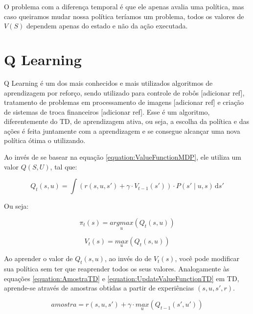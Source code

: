 O problema com a diferença temporal é que ele apenas avalia uma política, mas caso queiramos mudar nossa política teríamos um problema, todos os valores de $ V \left( S \right) $ dependem apenas do estado e não da ação executada.

\section{Q Learning}

Q Learning é um dos mais conhecidos e mais utilizados algoritmos de aprendizagem por reforço, sendo utilizado para controle de robôs [adicionar ref], tratamento de problemas em processamento de imagens [adicionar ref] e criação de sistemas de troca financeiros [adicionar ref]. Esse é um algoritmo, diferentemente do TD, de aprendizagem ativa, ou seja, a escolha da política e das ações é feita juntamente com a aprendizagem e se consegue alcançar uma nova política ótima o utilizando.

Ao invés de se basear na equação \ref{equation:ValueFunctionMDP}, ele utiliza um valor $ Q \left( S, U \right) $, tal que:

\begin{equation} \label{equation:QValueFunctionQLearning}
    Q_t \left( s, u \right) = \int \! \left( r \left( s, u, s' \right) + \gamma \cdot V_{t-1} \left( s' \right) \right) \cdot P \left( s' \mid u, s \right) \, \mathrm{d}s'
\end{equation}

Ou seja:

\begin{equation} \label{equation:PolicySelectionQLearning}
    \pi_t \left( s \right) = \underset{u}{argmax} \left( Q_t \left( s, u \right) \right)
\end{equation}

\begin{equation}
    V_t \left( s \right) = \underset{u}{max} \left( Q_t \left( s, u \right) \right)
\end{equation}

Ao aprender o valor de $ Q_t \left( s, u \right) $, ao invés do de $ V_t \left( s \right) $, você pode modificar sua política sem ter que reaprender todos os seus valores. Analogamente às equações \ref{equation:AmostraTD} e \ref{equation:UpdateValueFunctionTD} em TD, aprende-se através de amostras obtidas a partir de experiências $ \left( s, u, s', r \right) $.


\begin{equation}
	amostra = r \left( s, u, s' \right) + \gamma \cdot \underset{u}{max} \left( Q_{t-1} \left( s', u' \right) \right)
\end{equation}

